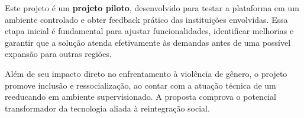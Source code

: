 \par Este projeto é um \textbf{projeto piloto}, desenvolvido para testar a plataforma em um ambiente controlado e obter feedback prático das instituições envolvidas. Essa etapa inicial é fundamental para ajustar funcionalidades, identificar melhorias e garantir que a solução atenda efetivamente às demandas antes de uma possível expansão para outras regiões.

\par Além de seu impacto direto no enfrentamento à violência de gênero, o projeto promove inclusão e ressocialização, ao contar com a atuação técnica de um reeducando em ambiente supervisionado. A proposta comprova o potencial transformador da tecnologia aliada à reintegração social.
